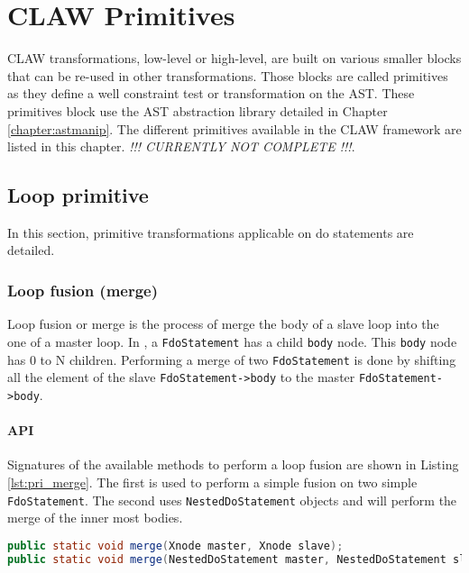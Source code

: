 \chapter{CLAW Primitives}
\label{chapter:primitives}
CLAW transformations, low-level or high-level, are built on various smaller 
blocks that can be re-used in other transformations. Those blocks are called
primitives as they define a well constraint test or transformation on the
\xcodeml AST. These primitives block use the \xcodeml AST abstraction library
detailed in Chapter \ref{chapter:astmanip}.
The different primitives available in the CLAW framework are listed in this
chapter. 
\textit{!!! CURRENTLY NOT COMPLETE !!!}.

\section{Loop primitive}
In this section, primitive transformations applicable on do statements are 
detailed.

\subsection{Loop fusion (merge)}
Loop fusion or merge is the process of merge the body of a slave loop into
the one of a master loop.
In \xcodeml, a \lstinline|FdoStatement| has a child \lstinline|body| node.
This \lstinline|body| node has 0 to N children. Performing a merge of two
\lstinline|FdoStatement| is done by shifting all the element of the slave
\lstinline|FdoStatement->body| to the master \lstinline|FdoStatement->body|.

\subsubsection{API}
Signatures of the available methods to perform a loop fusion are shown in
Listing \ref{lst:pri_merge}. The first is used to perform a simple fusion 
on two simple \lstinline|FdoStatement|. The second uses 
\lstinline|NestedDoStatement| objects and will perform the merge of the 
inner most bodies.

\begin{lstlisting}[label=lst:pri_merge, language=java,title=LoopTransform.java]
public static void merge(Xnode master, Xnode slave);
public static void merge(NestedDoStatement master, NestedDoStatement slave);
\end{lstlisting}

